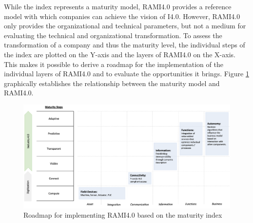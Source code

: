 While the index represents a maturity model, \ac{RAMI4.0} provides a reference model with which companies can achieve the vision of \ac{I4.0}. However, \ac{RAMI4.0} only provides the organizational and technical parameters, but not a medium for evaluating the technical and organizational transformation. To assess the transformation of a company and thus the maturity level, the individual steps of the index are plotted on the Y-axis and the layers of \ac{RAMI4.0} on the X-axis. This makes it possible to derive a roadmap for the implementation of the individual layers of \ac{RAMI4.0} and to evaluate the opportunities it brings. Figure \ref{fig:roadmap} graphically establishes the relationship between the maturity model and \ac{RAMI4.0}.

\begin{figure}[h]
\centering
\includegraphics[scale=0.25]{content/pictures/rami_roadmap.png}
\caption{Roadmap for implementing RAMI4.0 based on the maturity index}
\label{fig:roadmap}
\end{figure}

